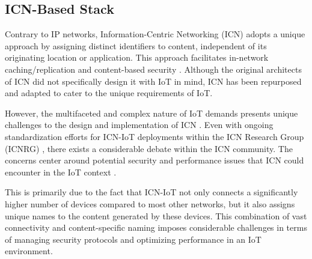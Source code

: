 \documentclass{ieeeaccess}
\begin{document}
\subsection{ICN-Based Stack}
Contrary to IP networks, Information-Centric Networking (ICN) adopts a unique approach by assigning distinct identifiers to content, independent of its originating location or application. This approach facilitates in-network caching/replication and content-based security \cite{amadeo2016information}. Although the original architects of ICN did not specifically design it with IoT in mind, ICN has been repurposed and adapted to cater to the unique requirements of IoT.

However, the multifaceted and complex nature of IoT demands presents unique challenges to the design and implementation of ICN \cite{amadeo2016information}. Even with ongoing standardization efforts for ICN-IoT deployments within the ICN Research Group (ICNRG) \cite{irtf-icnrg-icniot-03}, there exists a considerable debate within the ICN community. The concerns center around potential security and performance issues that ICN could encounter in the IoT context \cite{amadeo2016information,fang2018survey}.

This is primarily due to the fact that ICN-IoT not only connects a significantly higher number of devices compared to most other networks, but it also assigns unique names to the content generated by these devices. This combination of vast connectivity and content-specific naming imposes considerable challenges in terms of managing security protocols and optimizing performance in an IoT environment. 
\end{document}
